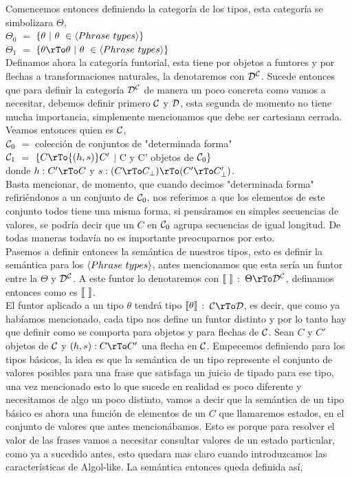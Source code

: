 Comencemos entonces definiendo la categor\'ia de los tipos, esta categor\'ia
se simbolizara $\Theta$,\\

\noindent $\Theta_0$ $=$ $\{\theta \ | \ \theta \ \in \langle Phrase \ types \rangle \}$\\
$\Theta_1$ $=$ $\{\theta \rTo \theta \ | \ \theta \ \in \lrangles{Phrase \ types} \}$\\

Definamos ahora la categor\'ia funtorial, esta tiene por objetos a funtores y 
por flechas a transformaciones naturales, la denotaremos con ${\mathcal{D}}^{\mathcal{C}}$. Sucede entonces
que para definir la categor\'ia ${\mathcal{D}}^{\mathcal{C}}$ de manera un poco concreta como vamos a 
necesitar, debemos definir primero $\mathcal{C}$ y $\mathcal{D}$, esta segunda de momento no tiene
mucha importancia, simplemente mencionamos que debe ser cartesiana cerrada. 
Veamos entonces quien es $\mathcal{C}$, \\

\noindent
$\mathcal{C}_0$ $=$ colecci\'on de conjuntos de "determinada forma"\\
$\mathcal{C}_1$ $=$ $\{C \rTo{(h,s)} C' $ $|$  C y C' objetos de $\mathcal{C}_0 \}$ \\
donde $h : C' \rTo C$ y $s : (C \rTo C_\bot) \rTo (C' \rTo C'_\bot)$.\\

Basta mencionar, de momento, que cuando decimos "determinada forma" 
refiri\'endonos a un conjunto de $\mathcal{C}_0$, nos referimos a que los
elementos de este conjunto todos tiene una misma forma, si pens\'aramos
en simples secuencias de valores, se podr\'ia decir que un $C$ en $\mathcal{C}_0$
agrupa secuencias de igual longitud. De todas maneras todav\'ia no
es importante preocuparnos por esto.\\

Pasemos a definir entonces la sem\'antica de nuestros tipos, esto es
definir la sem\'antica para los $\langle Phrase \ types \rangle$, antes
mencionamos que esta ser\'ia un funtor entre la $\Theta$ y ${\mathcal{D}}^{\mathcal{C}}$.
A este funtor lo denotaremos con $\llbracket  \  \rrbracket$ $:$ $\Theta \rTo \DC$,
definamos entonces como es $\llbracket  \  \rrbracket$. \\
El funtor aplicado a un tipo $\theta$ tendr\'a tipo
$\llbracket  \theta  \rrbracket$ $:$ $\C \rTo \D$, es decir, que como ya
hab\'iamos mencionado, cada tipo nos define un funtor distinto y 
por lo tanto hay que definir como se comporta para objetos y para 
flechas de $\mathcal{C}$. Sean $C$ y $C'$ objetos de $\mathcal{C}$ y $(h,s) : C \rTo C'$ 
una flecha en $\mathcal{C}$. Empecemos definiendo para los tipos b\'asicos, la
idea es que la sem\'antica de un tipo represente el conjunto de valores
posibles para una frase que satisfaga un juicio de tipado para ese tipo,
una vez mencionado esto lo que sucede en realidad es poco diferente y 
necesitamos de algo un poco distinto, vamos a decir que la sem\'antica
de un tipo b\'asico es ahora una funci\'on de elementos de un $C$ que llamaremos
estados, en el conjunto de valores que antes mencion\'abamos. Esto es porque para
resolver el valor de las frases vamos a necesitar consultar valores de un estado
particular, como ya a sucedido antes, esto quedara mas claro cuando 
introduzcamos las caracter\'isticas de Algol-like. La sem\'antica 
entonces queda definida as\'i,\\

